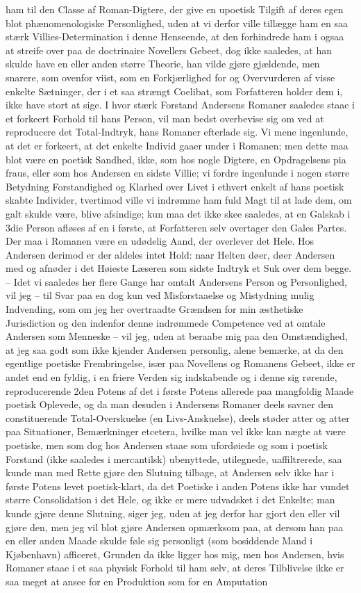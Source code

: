 \documentclass[12pt,a4paper]{article}
\begin{document}
ham til den Classe af Roman-Digtere, der give en upoetisk Tilgift af deres egen blot phænomenologiske Personlighed, uden at vi derfor ville tillægge ham en saa stærk Villies-Determination i denne Henseende, at den forhindrede ham i ogsaa at streife over paa de doctrinaire Novellers Gebeet, dog ikke saaledes, at han skulde have en eller anden større Theorie, han vilde gjøre gjældende, men snarere, som ovenfor viist, som en Forkjærlighed for og Overvurderen af visse enkelte Sætninger, der i et saa strængt Coelibat, som Forfatteren holder dem i, ikke have stort at sige. I hvor stærk Forstand Andersens Romaner saaledes staae i et forkeert Forhold til hans Person, vil man bedst overbevise sig om ved at reproducere det Total-Indtryk, hans Romaner efterlade sig. Vi mene ingenlunde, at det er forkeert, at det enkelte Individ gaaer under i Romanen; men dette maa blot være en poetisk Sandhed, ikke, som hos nogle Digtere, en Opdragelsens pia fraus, eller som hos Andersen en sidste Villie; vi fordre ingenlunde i nogen større Betydning Forstandighed og Klarhed over Livet i ethvert enkelt af hans poetisk skabte Individer, tvertimod ville vi indrømme ham fuld Magt til at lade dem, om galt skulde være, blive afsindige; kun maa det ikke skee saaledes, at en Galskab i 3die Person afløses af en i første, at Forfatteren selv overtager den Gales Partes. Der maa i Romanen være en udødelig Aand, der overlever det Hele. Hos Andersen derimod er der aldeles intet Hold: naar Helten døer, døer Andersen med og afnøder i det Høieste Læseren som sidste Indtryk et Suk over dem begge. – Idet vi saaledes her flere Gange har omtalt Andersens Person og Personlighed, vil jeg – til Svar paa en dog kun ved Misforstaaelse og Mistydning mulig Indvending, som om jeg her overtraadte Grændsen for min æsthetiske Jurisdiction og den indenfor denne indrømmede Competence ved at omtale Andersen som Menneske – vil jeg, uden at beraabe mig paa den Omstændighed, at jeg saa godt som ikke kjender Andersen personlig, alene bemærke, at da den egentlige poetiske Frembringelse, især paa Novellens og Romanens Gebeet, ikke er andet end en fyldig, i en friere Verden sig indskabende og i denne sig rørende, reproducerende 2den Potens af det i første Potens allerede paa mangfoldig Maade poetisk Oplevede, og da man desuden i Andersens Romaner deels savner den constituerende Total-Overskuelse (en Livs-Anskuelse), deels støder atter og atter paa Situationer, Bemærkninger etcetera, hvilke man vel ikke kan nægte at være poetiske, men som dog hos Andersen staae som ufordøiede og som i poetisk Forstand (ikke saaledes i mercantilsk) ubenyttede, utilegnede, uaffiltrerede, saa kunde man med Rette gjøre den Slutning tilbage, at Andersen selv ikke har i første Potens levet poetisk-klart, da det Poetiske i anden Potens ikke har vundet større Consolidation i det Hele, og ikke er mere udvadsket i det Enkelte; man kunde gjøre denne Slutning, siger jeg, uden at jeg derfor har gjort den eller vil gjøre den, men jeg vil blot gjøre Andersen opmærksom paa, at dersom han paa en eller anden Maade skulde føle sig personligt (som bosiddende Mand i Kjøbenhavn) afficeret, Grunden da ikke ligger hos mig, men hos Andersen, hvis Romaner staae i et saa physisk Forhold til ham selv, at deres Tilblivelse ikke er saa meget at ansee for en Produktion som for en Amputation 
\end{document}

